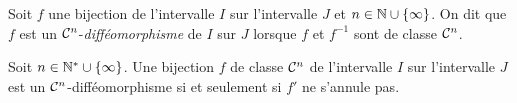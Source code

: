 \documentclass{magnoliaold}
\begin{document}

\begin{definition}[utile=-3]
Soit $f$ une bijection de l'intervalle $I$ sur l'intervalle $J$ et
$n\in\mathbb{N}\cup\left\{\infty\right\}$. On dit que $f$ est un $\mathcal{C}^{n}$-\emph{difféomorphisme}
de $I$ sur $J$ lorsque $f$ et $f^{-1}$ sont de classe $\mathcal{C}^{n}$.
\end{definition}


\begin{proposition}[utile=-3]
Soit $n\in{\mathbb{N}^*}\cup\left\{\infty\right\}$. Une bijection $f$ de classe $\mathcal{C}^{n}$ de
l'intervalle $I$ sur l'intervalle $J$ est un $\mathcal{C}^{n}$-difféomorphisme si
et seulement si $f'$ ne s'annule pas.
\end{proposition}
\end{document}
